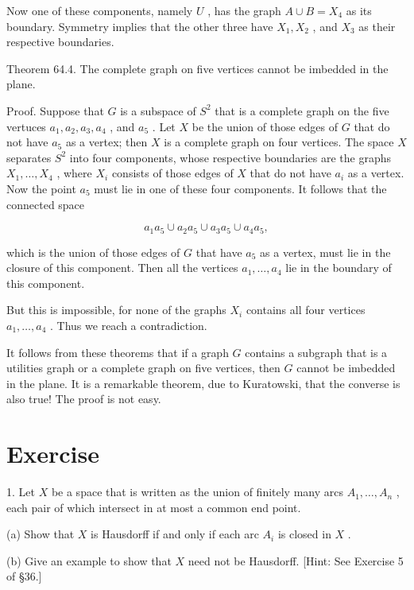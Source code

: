 \documentclass[10pt]{article}
\begin{document}
Now one of these components, namely \(U\) , has the graph \(A \cup  B = {X}_{4}\) as its boundary. Symmetry implies that the other three have \({X}_{1},{X}_{2}\) , and \({X}_{3}\) as their respective boundaries.

Theorem 64.4. The complete graph on five vertices cannot be imbedded in the plane.

Proof. Suppose that \(G\) is a subspace of \({S}^{2}\) that is a complete graph on the five vertuces \({a}_{1},{a}_{2},{a}_{3},{a}_{4}\) , and \({a}_{5}\) . Let \(X\) be the union of those edges of \(G\) that do not have \({a}_{5}\) as a vertex; then \(X\) is a complete graph on four vertices. The space \(X\) separates \({S}^{2}\) into four components, whose respective boundaries are the graphs \({X}_{1},\ldots ,{X}_{4}\) , where \({X}_{i}\) consists of those edges of \(X\) that do not have \({a}_{i}\) as a vertex. Now the point \({a}_{5}\) must lie in one of these four components. It follows that the connected space

\[
{a}_{1}{a}_{5} \cup  {a}_{2}{a}_{5} \cup  {a}_{3}{a}_{5} \cup  {a}_{4}{a}_{5},
\]

which is the union of those edges of \(G\) that have \({a}_{5}\) as a vertex, must lie in the closure of this component. Then all the vertices \({a}_{1},\ldots ,{a}_{4}\) lie in the boundary of this component.

But this is impossible, for none of the graphs \({X}_{i}\) contains all four vertices \({a}_{1},\ldots ,{a}_{4}\) . Thus we reach a contradiction.

It follows from these theorems that if a graph \(G\) contains a subgraph that is a utilities graph or a complete graph on five vertices, then \(G\) cannot be imbedded in the plane. It is a remarkable theorem, due to Kuratowski, that the converse is also true! The proof is not easy.

\section*{Exercise}

1. Let \(X\) be a space that is written as the union of finitely many arcs \({A}_{1},\ldots ,{A}_{n}\) , each pair of which intersect in at most a common end point.

(a) Show that \(X\) is Hausdorff if and only if each arc \({A}_{i}\) is closed in \(X\) .

(b) Give an example to show that \(X\) need not be Hausdorff. [Hint: See Exercise 5 of §36.]
\end{document}
